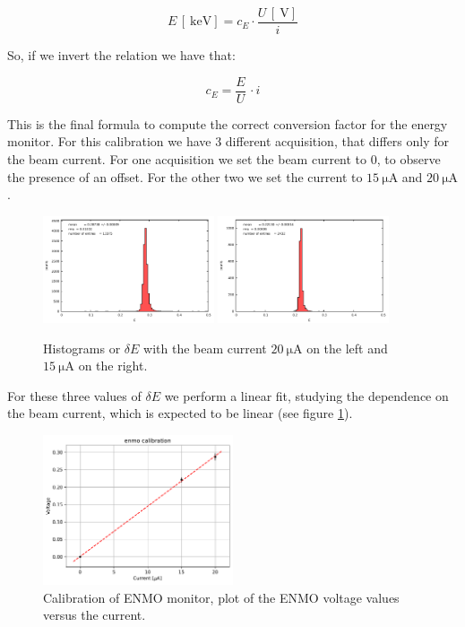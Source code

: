 \begin{equation} \label{eq:EnergyVolt}
 E \, [\SI{}{\kilo \electronvolt}] = c_{E} \cdot \dfrac{ U \, [\SI{}{\volt}]}{i}
\end{equation}

So, if we invert the relation we have that:

\begin{equation}
c_{E} = \frac{E}{U} \, \cdot i
\end{equation}  

This is the final formula to compute the correct conversion factor for the energy monitor. For this calibration we have 3 different acquisition, that differs only for the beam current. For one acquisition we set the beam current to $0$, to observe the presence of an offset. For the other two we set the current to $\SI{15}{\micro \ampere}$ and $\SI{20}{\micro \ampere}$.

\begin{figure}[!h]
\centering
\includegraphics[width = 0.45\textwidth]{Analysis/ENMOvoltage20.pdf}
\includegraphics[width = 0.45\textwidth]{Analysis/ENMOvoltage15.pdf} 
\caption{Histograms or $\delta E$ with the beam current $\SI{20}{\micro \ampere}$ on the left and $\SI{15}{\micro \ampere}$ on the right.}
\end{figure}

For these three values of $\delta E$ we perform a linear fit, studying the dependence on the beam current, which is expected to be linear (see figure \ref{fig:EnmoFit}).

\begin{figure}[!h]
\centering
\includegraphics[width = 0.5\textwidth]{Analysis/Calibrations/E18_Calibration.pdf}
\caption{Calibration of ENMO monitor, plot of the ENMO voltage values versus the current.}
\label{fig:EnmoFit}
\end{figure}

